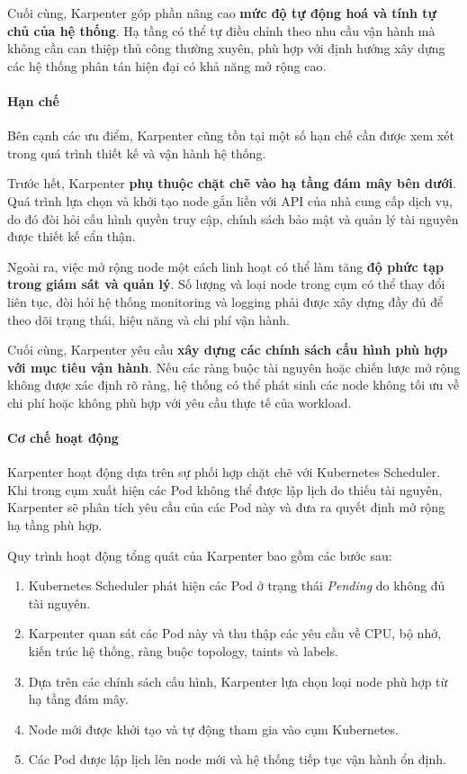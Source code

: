 Cuối cùng, Karpenter góp phần nâng cao \textbf{mức độ tự động hoá và tính tự chủ của hệ thống}. 
Hạ tầng có thể tự điều chỉnh theo nhu cầu vận hành mà không cần can thiệp thủ công thường xuyên, 
phù hợp với định hướng xây dựng các hệ thống phân tán hiện đại có khả năng mở rộng cao.

\paragraph*{Hạn chế}

Bên cạnh các ưu điểm, Karpenter cũng tồn tại một số hạn chế cần được xem xét trong quá trình 
thiết kế và vận hành hệ thống.

Trước hết, Karpenter \textbf{phụ thuộc chặt chẽ vào hạ tầng đám mây bên dưới}. 
Quá trình lựa chọn và khởi tạo node gắn liền với API của nhà cung cấp dịch vụ, 
do đó đòi hỏi cấu hình quyền truy cập, chính sách bảo mật và quản lý tài nguyên 
được thiết kế cẩn thận.

Ngoài ra, việc mở rộng node một cách linh hoạt có thể làm tăng 
\textbf{độ phức tạp trong giám sát và quản lý}. 
Số lượng và loại node trong cụm có thể thay đổi liên tục, 
đòi hỏi hệ thống monitoring và logging phải được xây dựng đầy đủ 
để theo dõi trạng thái, hiệu năng và chi phí vận hành.

Cuối cùng, Karpenter yêu cầu \textbf{xây dựng các chính sách cấu hình phù hợp với mục tiêu vận hành}. 
Nếu các ràng buộc tài nguyên hoặc chiến lược mở rộng không được xác định rõ ràng, 
hệ thống có thể phát sinh các node không tối ưu về chi phí hoặc không phù hợp 
với yêu cầu thực tế của workload.


\paragraph*{Cơ chế hoạt động}

Karpenter hoạt động dựa trên sự phối hợp chặt chẽ với Kubernetes Scheduler. 
Khi trong cụm xuất hiện các Pod không thể được lập lịch do thiếu tài nguyên, 
Karpenter sẽ phân tích yêu cầu của các Pod này và đưa ra quyết định mở rộng hạ tầng phù hợp.

Quy trình hoạt động tổng quát của Karpenter bao gồm các bước sau:

\begin{enumerate}
    \item Kubernetes Scheduler phát hiện các Pod ở trạng thái \textit{Pending} do không đủ tài nguyên.
    \item Karpenter quan sát các Pod này và thu thập các yêu cầu về CPU, bộ nhớ, kiến trúc hệ thống, 
    ràng buộc topology, taints và labels.
    \item Dựa trên các chính sách cấu hình, Karpenter lựa chọn loại node phù hợp từ hạ tầng đám mây.
    \item Node mới được khởi tạo và tự động tham gia vào cụm Kubernetes.
    \item Các Pod được lập lịch lên node mới và hệ thống tiếp tục vận hành ổn định.
\end{enumerate}

